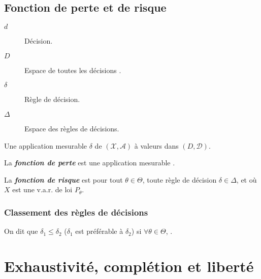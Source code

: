 \documentclass[10pt, french]{report}
\begin{document}
\begin{multicols*}{2}
\section{Fonction de perte et de risque}
\begin{distributions}[Notation]
\begin{description}
	\item[$d$]	Décision.
	\item[$D$]	Espace de toutes les décisions .
	\item[$\delta$]	Règle de décision.
	\item[$\Delta$]	Espace des règles de décisions.
\end{description}
\end{distributions}

\begin{definitionNOHFILL}
Une application mesurable $\delta$ de $(\mathcal{X}, \mathcal{A})$ à valeurs dans $(D, \mathcal{D})$. 
\end{definitionNOHFILL}


\begin{definitionNOHFILL}
La \textbf\textit{{fonction de perte}} est une application mesurable .
\end{definitionNOHFILL}

\begin{definitionNOHFILL}
La \textbf\textit{{fonction de risque}} est  pour tout $\theta \in \Theta$, toute règle de décision $\delta \in \Delta$, et où $X$ est une v.a.r. de loi $P_{\theta}$.
\end{definitionNOHFILL}


\subsection{Classement des règles de décisions}
On dit que $\delta_{1} \leq \delta_{2}$ ($\delta_{1}$ est préférable à $\delta_{2}$) si $\forall \theta \in \Theta$, .



\newpage
\chapter{Exhaustivité, complétion et liberté}

\end{multicols*}
\end{document}
